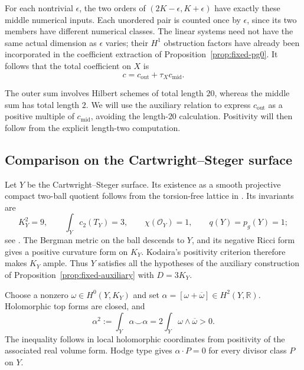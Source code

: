 For each nontrivial $\epsilon$, the two orders of
$(2K-\epsilon,K+\epsilon)$ have exactly these middle numerical inputs.
Each unordered pair is counted once by $\epsilon$, since its two
members have different numerical classes.  The linear systems need
not have the same actual dimension as $\epsilon$ varies; their
$H^1$ obstruction factors have already been incorporated in the
coefficient extraction of Proposition~\ref{prop:fixed-pg0}.
It follows that the total coefficient on $X$ is
\begin{equation}\label{r1:target-coefficient}
 c=c_{\mathrm{out}}+\tau_Xc_{\mathrm{mid}}.
\end{equation}

The outer sum involves Hilbert schemes of total length $20$, whereas the
middle sum has total length $2$. We will use the auxiliary relation to
express $c_{\mathrm{out}}$ as a positive multiple of $c_{\mathrm{mid}}$,
avoiding the length-$20$ calculation. Positivity will then follow from
the explicit length-two computation.

\subsection{Comparison on the Cartwright--Steger surface}

Let $Y$ be the Cartwright--Steger surface.  Its existence as a smooth
projective compact two-ball quotient follows from the torsion-free
lattice in \cite[Theorem~2]{CKY}.  Its invariants are
\begin{equation}\label{r1:auxiliary-invariants}
 K_Y^2=9,\qquad \int_Yc_2(T_Y)=3,\qquad
 \chi(\mathcal O_Y)=1,\qquad q(Y)=p_g(Y)=1;
\end{equation}
see \cite[Main Theorem~(a) and Lemma~3]{CKY}.
The Bergman metric on the ball descends to $Y$, and its negative
Ricci form gives a positive curvature form on $K_Y$.  Kodaira's
positivity criterion therefore makes $K_Y$ ample.  Thus $Y$ satisfies
all the hypotheses of the auxiliary construction of
Proposition~\ref{prop:fixed-auxiliary} with $D=3K_Y$.

Choose a nonzero $\omega\in H^0(Y,K_Y)$ and set
$\alpha=[\omega+\overline\omega]\in H^2(Y,\mathbb R)$.  Holomorphic
top forms are closed, and
\begin{equation}\label{r1:test-class}
 \alpha^2:=\int_Y\alpha\smile\alpha
   =2\int_Y\omega\wedge\overline\omega>0.
\end{equation}
The inequality follows in local holomorphic coordinates from positivity
of the associated real volume form.  Hodge type gives
$\alpha\cdot P=0$ for every divisor class $P$ on $Y$.

